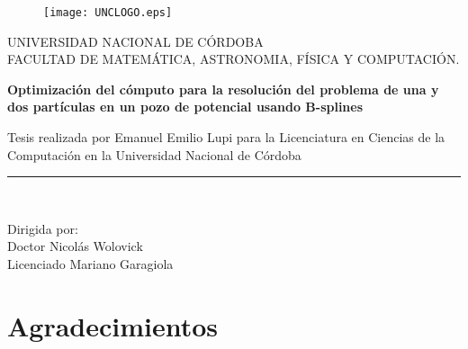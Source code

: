 \documentclass[a4paper,openright, 12pt, oneside]{book}
\begin{document}
\begin{titlepage}
\begin{center}

\begin{figure}
  \begin{center}
    \leavevmode

    \texttt{[image: UNCLOGO.eps]}
  \end{center}
\end{figure}

\vspace*{0.4in}
UNIVERSIDAD NACIONAL DE C\'ORDOBA\\
\vspace*{0.15in}
FACULTAD DE MATEM\'ATICA, ASTRONOMIA, F\'ISICA Y COMPUTACI\'ON.\\
\vspace*{0.6in}
\begin{large}
\end{large}
\vspace*{0.2in}
\begin{Large}
\textbf{Optimizaci\'on del c\'omputo para la resoluci\'on del problema de una y dos part\'iculas en un pozo de potencial usando B-splines} \\
\end{Large}
\vspace*{0.3in}
\begin{large}
Tesis realizada por Emanuel Emilio Lupi para la Licenciatura en Ciencias de la Computaci\'on en la Universidad Nacional de C\'ordoba\end{large}

\vspace*{0.3in}
\rule{80mm}{0.1mm}\\
\vspace*{0.1in}
\begin{large}
Dirigida por: \\
Doctor Nicol\'as Wolovick\\
Licenciado Mariano Garagiola\\
\vspace*{0.1in}
\end{large}
\end{center}
\end{titlepage}

\mbox{}
\thispagestyle{empty}

\chapter*{Agradecimientos} %
\end{document}
